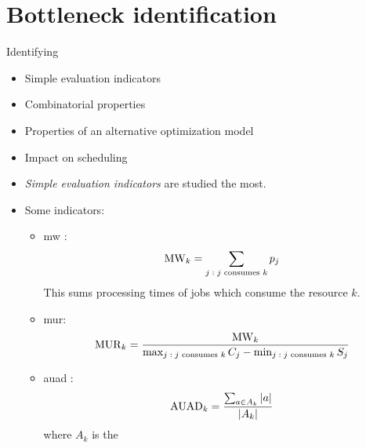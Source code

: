 \section*{Bottleneck identification}

Identifying 

\begin{itemize}
    \item Simple evaluation indicators
    \item Combinatorial properties
    \item Properties of an alternative optimization model
    \item Impact on scheduling
\end{itemize}

\begin{itemize}
    \item \emph{Simple evaluation indicators} are studied the most.

    \item Some indicators:
    \begin{itemize}
        \item \ac{mw} \citep{}:
            $$
            \operatorname{MW}_{k} = \sum_{j \;:\; \text{$j$ consumes $k$}} p_j
            $$ 
            This sums processing times of jobs which consume the resource $k$.

        \item \ac{mur}:
            $$
            \operatorname{MUR}_{k} = \frac{\operatorname{MW}_{k}}{\max_{j \;:\; \text{$j$ consumes $k$}} C_j - \min_{j \;:\; \text{$j$ consumes $k$}} S_j}
            $$

        \item \ac{auad} \citep{ROSER2001}:
            $$
            \operatorname{AUAD}_{k} = \frac{\sum_{a \in A_k} \left|{a}\right|}{\left|{A_k}\right|}
            $$
            where $A_k$ is the 
    \end{itemize}
\end{itemize}
